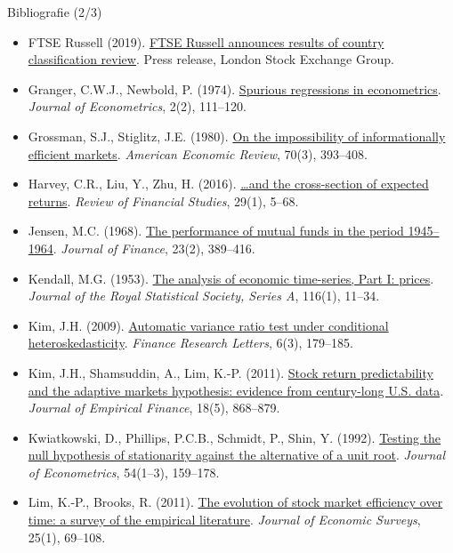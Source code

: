 \begin{frame}{Bibliografie (2/3)}
\itemsize{\tiny}
\begin{itemize}
    \item FTSE Russell (2019). \href{https://www.lseg.com/en/media-centre/press-releases/ftse-russell/2019/ftse-russell-announces-results-country-classification-review-equities-and-fixed-income}{FTSE Russell announces results of country classification review}. Press release, London Stock Exchange Group.
    \item Granger, C.W.J., Newbold, P. (1974). \href{https://doi.org/10.1016/0304-4076(74)90034-7}{Spurious regressions in econometrics}. \textit{Journal of Econometrics}, 2(2), 111--120.
    \item Grossman, S.J., Stiglitz, J.E. (1980). \href{https://ideas.repec.org/a/aea/aecrev/v70y1980i3p393-408.html}{On the impossibility of informationally efficient markets}. \textit{American Economic Review}, 70(3), 393--408.
    \item Harvey, C.R., Liu, Y., Zhu, H. (2016). \href{https://doi.org/10.1093/rfs/hhv059}{\ldots and the cross-section of expected returns}. \textit{Review of Financial Studies}, 29(1), 5--68.
    \item Jensen, M.C. (1968). \href{https://doi.org/10.1111/j.1540-6261.1968.tb00815.x}{The performance of mutual funds in the period 1945--1964}. \textit{Journal of Finance}, 23(2), 389--416.
    \item Kendall, M.G. (1953). \href{https://doi.org/10.2307/2980947}{The analysis of economic time-series, Part I: prices}. \textit{Journal of the Royal Statistical Society, Series A}, 116(1), 11--34.
    \item Kim, J.H. (2009). \href{https://doi.org/10.1016/j.frl.2009.04.003}{Automatic variance ratio test under conditional heteroskedasticity}. \textit{Finance Research Letters}, 6(3), 179--185.
    \item Kim, J.H., Shamsuddin, A., Lim, K.-P. (2011). \href{https://doi.org/10.1016/j.jempfin.2011.08.002}{Stock return predictability and the adaptive markets hypothesis: evidence from century-long U.S. data}. \textit{Journal of Empirical Finance}, 18(5), 868--879.
    \item Kwiatkowski, D., Phillips, P.C.B., Schmidt, P., Shin, Y. (1992). \href{https://doi.org/10.1016/0304-4076(92)90104-Y}{Testing the null hypothesis of stationarity against the alternative of a unit root}. \textit{Journal of Econometrics}, 54(1--3), 159--178.
    \item Lim, K.-P., Brooks, R. (2011). \href{https://doi.org/10.1111/j.1467-6419.2009.00611.x}{The evolution of stock market efficiency over time: a survey of the empirical literature}. \textit{Journal of Economic Surveys}, 25(1), 69--108.

\end{itemize}
\end{frame}
